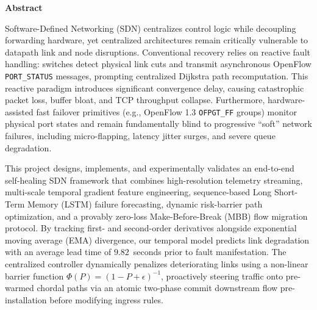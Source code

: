 \documentclass[11pt,a4paper]{report}
\begin{document}
\newpage
\thispagestyle{empty}
\vspace*{1.5cm}

\begin{center}
{\Large \bfseries Abstract \par}
\end{center}
\vspace{0.8cm}

\noindent Software-Defined Networking (SDN) centralizes control logic while decoupling forwarding hardware, yet centralized architectures remain critically vulnerable to datapath link and node disruptions. Conventional recovery relies on reactive fault handling: switches detect physical link cuts and transmit asynchronous OpenFlow \texttt{PORT\_STATUS} messages, prompting centralized Dijkstra path recomputation. This reactive paradigm introduces significant convergence delay, causing catastrophic packet loss, buffer bloat, and TCP throughput collapse. Furthermore, hardware-assisted fast failover primitives (e.g., OpenFlow 1.3 \texttt{OFPGT\_FF} groups) monitor physical port states and remain fundamentally blind to progressive ``soft'' network failures, including micro-flapping, latency jitter surges, and severe queue degradation.

\vspace{0.4cm}
\noindent This project designs, implements, and experimentally validates an end-to-end self-healing SDN framework that combines high-resolution telemetry streaming, multi-scale temporal gradient feature engineering, sequence-based Long Short-Term Memory (LSTM) failure forecasting, dynamic risk-barrier path optimization, and a provably zero-loss Make-Before-Break (MBB) flow migration protocol. By tracking first- and second-order derivatives alongside exponential moving average (EMA) divergence, our temporal model predicts link degradation with an average lead time of $9.82$~seconds prior to fault manifestation. The centralized controller dynamically penalizes deteriorating links using a non-linear barrier function $\Phi(P) = (1 - P + \epsilon)^{-1}$, proactively steering traffic onto pre-warmed chordal paths via an atomic two-phase commit downstream flow pre-installation before modifying ingress rules.
\end{document}
